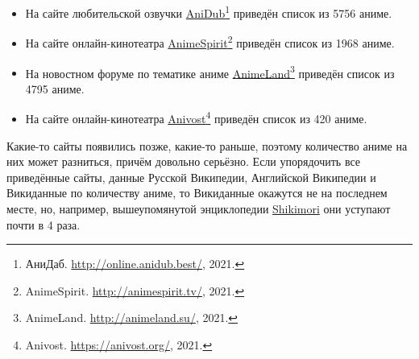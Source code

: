 \begin{itemize}
	\item На сайте любительской озвучки \href{http://online.anidub.best/}{AniDub}\footnote{АниДаб. \href{http://online.anidub.best/}{http://online.anidub.best/}, 2021.} приведён список из \num{5756} аниме.
	\item На сайте онлайн-кинотеатра \href{http://animespirit.tv/}{AnimeSpirit}\footnote{AnimeSpirit. \href{http://animespirit.tv/}{http://animespirit.tv/}, 2021.} приведён список из \num{1968} аниме.
	\item На новостном форуме по тематике аниме \href{http://animeland.su/}{AnimeLand}\footnote{AnimeLand. \href{http://animeland.su/}{http://animeland.su/}, 2021.} приведён список из \num{4795} аниме.
	\item На сайте онлайн-кинотеатра \href{https://anivost.org/}{Anivost}\footnote{Anivost. \href{https://anivost.org/}{https://anivost.org/}, 2021.} приведён список из 420 аниме.
\end{itemize}

Какие-то сайты появились позже, какие-то раньше, поэтому количество аниме на них может разниться, причём довольно серьёзно. Если упорядочить все приведённые сайты, данные Русской Википедии, Английской Википедии и Викиданные по количеству аниме, то Викиданные окажутся не на последнем месте, но, например, вышеупомянутой энциклопедии \href{https://shikimori.one/}{Shikimori} они уступают почти в 4 раза.



